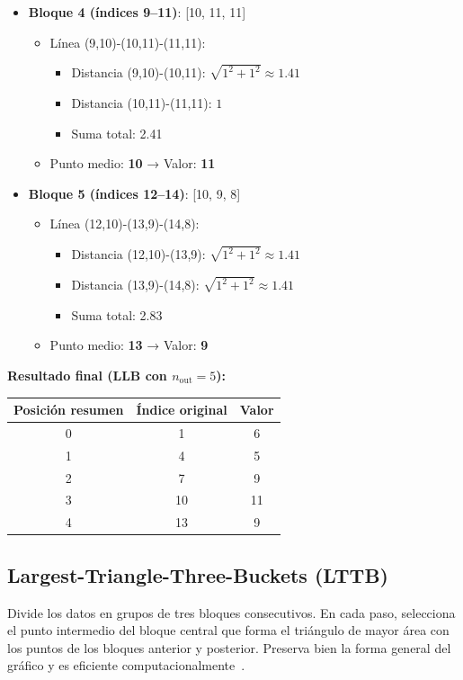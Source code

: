 \begin{itemize}
    \item \textbf{Bloque 4 (índices 9--11)}: [10, 11, 11]
    \begin{itemize}
        \item Línea (9,10)-(10,11)-(11,11):
        \begin{itemize}
            \item Distancia (9,10)-(10,11): $\sqrt{1^2 + 1^2} \approx 1.41$
            \item Distancia (10,11)-(11,11): $1$
            \item Suma total: 2.41
        \end{itemize}
        \item Punto medio: \textbf{10} → Valor: \textbf{11}
    \end{itemize}

    \item \textbf{Bloque 5 (índices 12--14)}: [10, 9, 8]
    \begin{itemize}
        \item Línea (12,10)-(13,9)-(14,8):
        \begin{itemize}
            \item Distancia (12,10)-(13,9): $\sqrt{1^2 + 1^2} \approx 1.41$
            \item Distancia (13,9)-(14,8): $\sqrt{1^2 + 1^2} \approx 1.41$
            \item Suma total: 2.83
        \end{itemize}
        \item Punto medio: \textbf{13} → Valor: \textbf{9}
    \end{itemize}
\end{itemize}

\bigskip

\noindent \textbf{Resultado final (LLB con $n_{\text{out}} = 5$):}

\begin{center}
\begin{tabular}{|c|c|c|}
\hline
Posición resumen & Índice original & Valor \\
\hline
0 & 1 & 6 \\
1 & 4 & 5 \\
2 & 7 & 9 \\
3 & 10 & 11 \\
4 & 13 & 9 \\
\hline
\end{tabular}
\end{center}

\subsection{Largest-Triangle-Three-Buckets (LTTB)} 
Divide los datos en grupos de tres bloques consecutivos. En cada paso, selecciona el punto intermedio del bloque central que forma el triángulo de mayor área con los puntos de los bloques anterior y posterior. Preserva bien la forma general del gráfico y es eficiente computacionalmente~\cite{steinarsson2013downsampling}.

